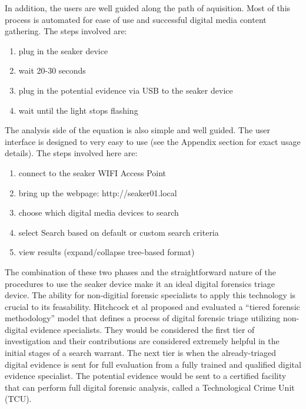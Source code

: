 \documentclass[12pt]{article}
\begin{document}
In addition, the users are well guided along the path of aquisition.  Most of this process is
automated for ease of use and successful digital media content gathering.  The steps involved
are:

\begin{enumerate}
  \item plug in the \gls{seaker} device
  \item wait 20-30 seconds
  \item plug in the potential evidence via USB to the \gls{seaker} device
  \item wait until the light stops flashing
\end{enumerate}

The analysis side of the equation is also simple and well guided.  The user interface is 
designed to very easy to use (see the Appendix section for exact usage details).  The steps
involved here are:

\begin{enumerate}
  \item connect to the \gls{seaker} WIFI Access Point
  \item bring up the webpage: http://seaker01.local
  \item choose which digital media devices to search
  \item select Search based on default or custom search criteria
  \item view results (expand/collapse tree-based format)
\end{enumerate}

The combination of these two phases and the straightforward nature of the procedures to use
the \gls{seaker} device make it an ideal digital forensics triage device.  The ability for
non-digitial forensic specialists to apply this technology is crucial to its feasability.
Hitchcock et al\cite{hitchcock2016tiered} proposed and evaluated a ``tiered forensic
methodology'' model that defines a process of digital forensic triage utilizing non-digital
evidence specialists.  They would be considered the first tier of investigation and their
contributions are considered extremely helpful in the initial stages of a search warrant.
The next tier is when the already-triaged digital evidence is sent for full evaluation from
a fully trained and qualified digital evidence specialist.
The potential evidence would be sent to a certified facility that can perform full digital
forensic analysis, called a Technological Crime Unit (TCU).\\
\end{document}
